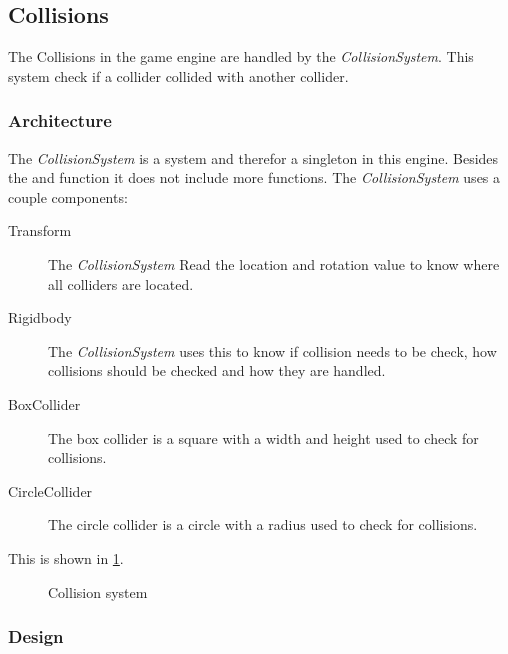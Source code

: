 \documentclass{projdoc}
\begin{document}
\subsection{Collisions}

The Collisions in the game engine are handled by the \emph{CollisionSystem}. This
system check if a collider collided with another collider.

\subsubsection{Architecture}

The \emph{CollisionSystem} is a system and therefor a singleton in this engine.
Besides the  and  function it does not
include more functions. The \emph{CollisionSystem} uses a couple
components:\noparbreak
\begin {description}
	\item[Transform] The \emph{CollisionSystem} Read the location and rotation value to
		know where all colliders are located.
	\item[Rigidbody] The \emph{CollisionSystem} uses this to know if collision needs to
		be check, how collisions should be checked and how they are handled.
	\item[BoxCollider] The box collider is a square with a width and height used to
		check for collisions.
	\item[CircleCollider] The circle collider is a circle with a radius used to check
		for collisions.
\end{description}
This is shown in \cref{fig:collision-system}.

\begin{figure}
	\centering
	\caption{Collision system}
	\label{fig:collision-system}
\end{figure}

\subsubsection{Design}
\end{document}
